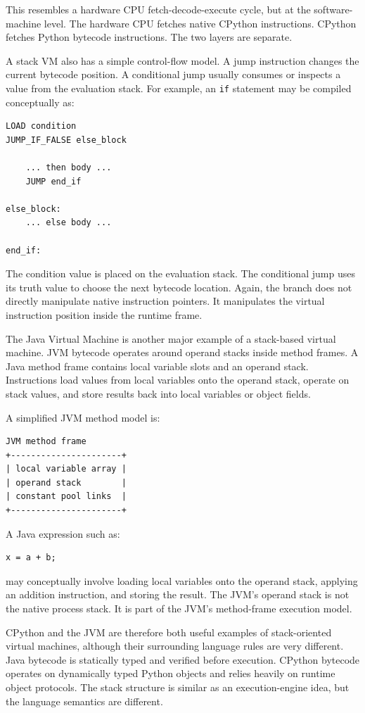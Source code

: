This resembles a hardware CPU fetch-decode-execute cycle, but at the software-machine level. The hardware CPU fetches native CPython instructions. CPython fetches Python bytecode instructions. The two layers are separate.

A stack VM also has a simple control-flow model. A jump instruction changes the current bytecode position. A conditional jump usually consumes or inspects a value from the evaluation stack. For example, an \texttt{if} statement may be compiled conceptually as:

\begin{verbatim}
LOAD condition
JUMP_IF_FALSE else_block

    ... then body ...
    JUMP end_if

else_block:
    ... else body ...

end_if:
\end{verbatim}

The condition value is placed on the evaluation stack. The conditional jump uses its truth value to choose the next bytecode location. Again, the branch does not directly manipulate native instruction pointers. It manipulates the virtual instruction position inside the runtime frame.

The Java Virtual Machine is another major example of a stack-based virtual machine. JVM bytecode operates around operand stacks inside method frames. A Java method frame contains local variable slots and an operand stack. Instructions load values from local variables onto the operand stack, operate on stack values, and store results back into local variables or object fields.

A simplified JVM method model is:

\begin{verbatim}
JVM method frame
+----------------------+
| local variable array |
| operand stack        |
| constant pool links  |
+----------------------+
\end{verbatim}

A Java expression such as:

\begin{verbatim}
x = a + b;
\end{verbatim}

may conceptually involve loading local variables onto the operand stack, applying an addition instruction, and storing the result. The JVM's operand stack is not the native process stack. It is part of the JVM's method-frame execution model.

CPython and the JVM are therefore both useful examples of stack-oriented virtual machines, although their surrounding language rules are very different. Java bytecode is statically typed and verified before execution. CPython bytecode operates on dynamically typed Python objects and relies heavily on runtime object protocols. The stack structure is similar as an execution-engine idea, but the language semantics are different.

